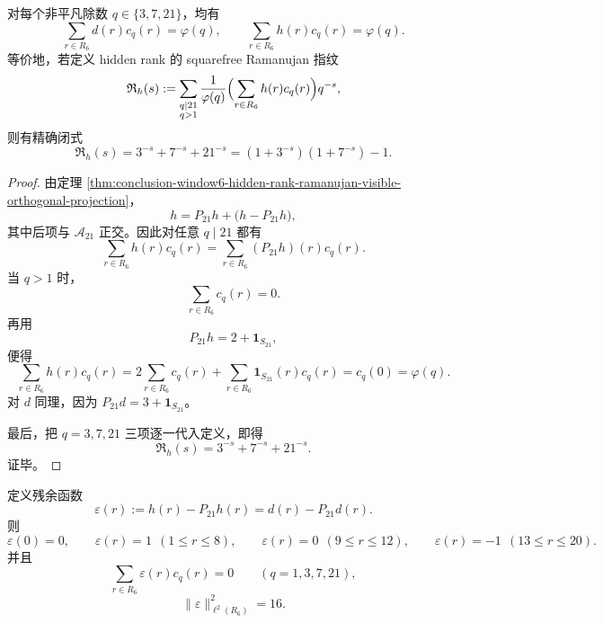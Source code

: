 \begin{corollary}\label{cor:conclusion-window6-nontrivial-conductor-unit-ramanujan-law}
对每个非平凡除数 \(q\in\{3,7,21\}\)，均有
\[
\sum_{r\in R_6} d(r)c_q(r)=\varphi(q),
\qquad
\sum_{r\in R_6} h(r)c_q(r)=\varphi(q).
\]
等价地，若定义 hidden rank 的 squarefree Ramanujan 指纹
\[
\mathfrak R_h(s):=
\sum_{\substack{q\mid 21\\ q>1}}
\frac{1}{\varphi(q)}
\Bigl(\sum_{r\in R_6}h(r)c_q(r)\Bigr)q^{-s},
\]
则有精确闭式
\[
\mathfrak R_h(s)=3^{-s}+7^{-s}+21^{-s}
=(1+3^{-s})(1+7^{-s})-1.
\]
\end{corollary}

\begin{proof}
由定理 \ref{thm:conclusion-window6-hidden-rank-ramanujan-visible-orthogonal-projection}，
\[
h=P_{21}h+\bigl(h-P_{21}h\bigr),
\]
其中后项与 \(\mathcal A_{21}\) 正交。因此对任意 \(q\mid 21\) 都有
\[
\sum_{r\in R_6}h(r)c_q(r)=\sum_{r\in R_6}(P_{21}h)(r)c_q(r).
\]
当 \(q>1\) 时，
\[
\sum_{r\in R_6}c_q(r)=0.
\]
再用
\[
P_{21}h=2+\mathbf 1_{S_{21}},
\]
便得
\[
\sum_{r\in R_6}h(r)c_q(r)
=
2\sum_{r\in R_6}c_q(r)+\sum_{r\in R_6}\mathbf 1_{S_{21}}(r)c_q(r)
=
c_q(0)
=
\varphi(q).
\]
对 \(d\) 同理，因为 \(P_{21}d=3+\mathbf 1_{S_{21}}\)。

最后，把 \(q=3,7,21\) 三项逐一代入定义，即得
\[
\mathfrak R_h(s)=3^{-s}+7^{-s}+21^{-s}.
\]
证毕。
\end{proof}

\begin{proposition}\label{prop:conclusion-window6-ramanujan-blind-residual-channel}
定义残余函数
\[
\varepsilon(r):=h(r)-P_{21}h(r)=d(r)-P_{21}d(r).
\]
则
\[
\varepsilon(0)=0,
\qquad
\varepsilon(r)=1\ \ (1\le r\le 8),
\qquad
\varepsilon(r)=0\ \ (9\le r\le 12),
\qquad
\varepsilon(r)=-1\ \ (13\le r\le 20).
\]
并且
\[
\sum_{r\in R_6}\varepsilon(r)c_q(r)=0
\qquad (q=1,3,7,21),
\]
\[
\|\varepsilon\|_{\ell^2(R_6)}^2=16.
\]
\end{proposition}

